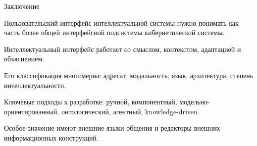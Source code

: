 \begin{frame}{Заключение}
	\topline
	\justifying

	\vspace{10mm}

	Пользовательский интерфейс интеллектуальной системы нужно понимать как часть более общей интерфейсной подсистемы кибернетической системы.
	
	\begin{textitemize}
		\item Интеллектуальный интерфейс работает со смыслом, контекстом, адаптацией и объяснением.
		\item Его классификация многомерна: адресат, модальность, язык, архитектура, степень интеллектуальности.
		\item Ключевые подходы к разработке: ручной, компонентный, модельно-ориентированный, онтологический, агентный, knowledge-driven.
		\item Особое значение имеют внешние языки общения и редакторы внешних информационных конструкций.
	\end{textitemize}
\end{frame}


